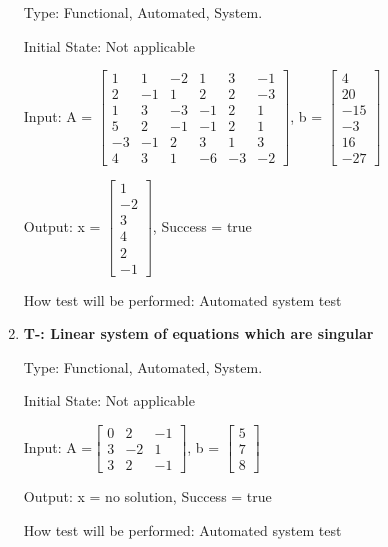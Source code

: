 \documentclass[12pt, titlepage]{article}
\newcounter{tnum}
\begin{document}
\begin{enumerate}
Type: Functional, Automated, System.
					
Initial State: Not applicable
					
Input: A = $\begin{bmatrix} 
1 & 1 & -2 & 1 & 3 & -1 \\
2 & -1 & 1 & 2 & 2 & -3 \\
1 & 3 & -3 & -1 & 2 &1 \\
5 & 2 &-1 & -1 & 2 & 1 \\
-3 & -1 & 2 & 3 & 1 &3 \\
4 & 3 & 1 & -6 & -3 & -2
\end{bmatrix}$, b  = $\begin{bmatrix} 
 4\\
20\\
-15\\
-3\\
16\\
-27 
\end{bmatrix}$
					
Output: x = $\begin{bmatrix} 
1\\
-2\\
3\\
4\\
2\\
-1 
\end{bmatrix}$, Success = true
					
How test will be performed: Automated system test

\item{\textbf{T-\thetnum \label{t-gauss-jordan_three}: Linear system of equations which are singular}}

Type: Functional, Automated, System.
					
Initial State: Not applicable
					
Input: A =$\begin{bmatrix} 
0 & 2 & -1 \\
3 & -2 & 1\\
3 & 2 & -1
\end{bmatrix}$, b = $\begin{bmatrix} 
5\\
7\\
8 
\end{bmatrix}$
					
Output: x = no solution, Success = true
					
How test will be performed: Automated system test

\end{enumerate}
\end{document}
